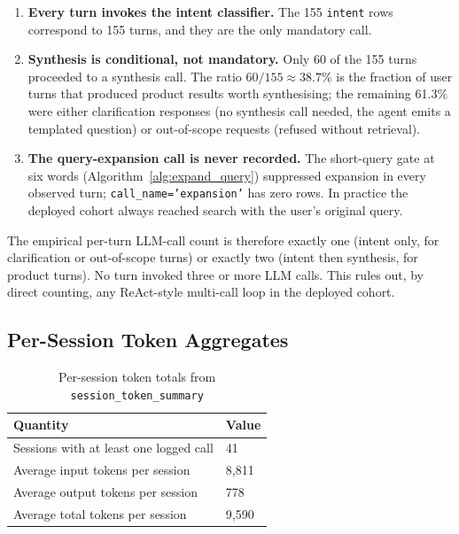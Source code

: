 \begin{enumerate}
    \item \textbf{Every turn invokes the intent classifier.} The 155 \texttt{intent} rows correspond to 155 turns, and they are the only mandatory call.
    \item \textbf{Synthesis is conditional, not mandatory.} Only 60 of the 155 turns proceeded to a synthesis call. The ratio $60/155 \approx 38.7\%$ is the fraction of user turns that produced product results worth synthesising; the remaining 61.3\% were either clarification responses (no synthesis call needed, the agent emits a templated question) or out-of-scope requests (refused without retrieval).
    \item \textbf{The query-expansion call is never recorded.} The short-query gate at six words (Algorithm~\ref{alg:expand_query}) suppressed expansion in every observed turn; \texttt{call\_name='expansion'} has zero rows. In practice the deployed cohort always reached search with the user's original query.
\end{enumerate}

The empirical per-turn LLM-call count is therefore exactly one (intent only, for clarification or out-of-scope turns) or exactly two (intent then synthesis, for product turns). No turn invoked three or more LLM calls. This rules out, by direct counting, any ReAct-style multi-call loop in the deployed cohort.

\subsection{Per-Session Token Aggregates}
\label{subsec:token_aggregates}

\begin{table}[H]
\centering
\begin{tabular}{p{6cm}p{4cm}}
\toprule
\textbf{Quantity} & \textbf{Value}\\
\midrule
Sessions with at least one logged call & 41\\
Average input tokens per session & 8{,}811\\
Average output tokens per session & 778\\
Average total tokens per session & 9{,}590\\
\bottomrule
\end{tabular}
\caption{Per-session token totals from \texttt{session\_token\_summary}}
\label{tab:token_aggregates}
\end{table}

